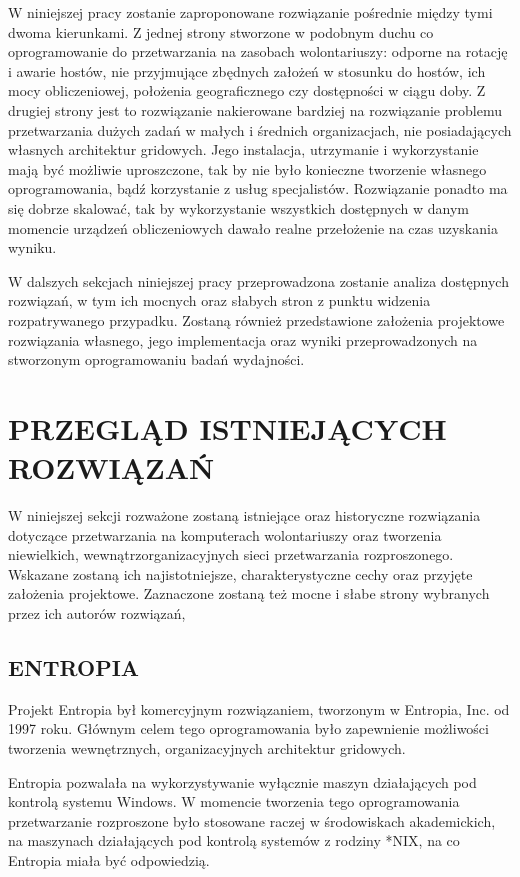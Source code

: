 \documentclass[12pt,a4paper,twoside]{article}
\begin{document}
W niniejszej pracy zostanie zaproponowane rozwiązanie pośrednie między tymi dwoma kierunkami. Z jednej strony stworzone w podobnym duchu co oprogramowanie do przetwarzania na zasobach wolontariuszy: odporne na rotację i awarie hostów, nie przyjmujące zbędnych założeń w stosunku do hostów, ich mocy obliczeniowej, położenia geograficznego czy dostępności w ciągu doby. Z drugiej strony jest to rozwiązanie nakierowane bardziej na rozwiązanie problemu przetwarzania dużych zadań w małych i średnich organizacjach, nie posiadających własnych architektur gridowych. Jego instalacja, utrzymanie i wykorzystanie mają być możliwie uproszczone, tak by nie było konieczne tworzenie własnego oprogramowania, bądź korzystanie z usług specjalistów. Rozwiązanie ponadto ma się dobrze skalować, tak by wykorzystanie wszystkich dostępnych w danym momencie urządzeń obliczeniowych dawało realne przełożenie na czas uzyskania wyniku.

W dalszych sekcjach niniejszej pracy przeprowadzona zostanie analiza dostępnych rozwiązań, w tym ich mocnych oraz słabych stron z punktu widzenia rozpatrywanego przypadku. Zostaną również przedstawione założenia projektowe rozwiązania własnego, jego implementacja oraz wyniki przeprowadzonych na stworzonym oprogramowaniu badań wydajności.


\section{PRZEGLĄD ISTNIEJĄCYCH ROZWIĄZAŃ}

W niniejszej sekcji rozważone zostaną istniejące oraz historyczne rozwiązania dotyczące przetwarzania na komputerach wolontariuszy oraz tworzenia niewielkich, wewnątrzorganizacyjnych sieci przetwarzania rozproszonego. Wskazane zostaną ich najistotniejsze, charakterystyczne cechy oraz przyjęte założenia projektowe. Zaznaczone zostaną też mocne i słabe strony wybranych przez ich autorów rozwiązań,

\subsection{ENTROPIA}

Projekt Entropia \cite{entropia} był komercyjnym rozwiązaniem, tworzonym w Entropia, Inc. od 1997 roku. Głównym celem tego oprogramowania było zapewnienie możliwości tworzenia wewnętrznych, organizacyjnych architektur gridowych. 

Entropia pozwalała na wykorzystywanie wyłącznie maszyn działających pod kontrolą systemu Windows. W momencie tworzenia tego oprogramowania przetwarzanie rozproszone było stosowane raczej w środowiskach akademickich, na maszynach działających pod kontrolą systemów z rodziny *NIX, na co Entropia miała być odpowiedzią.
\end{document}
